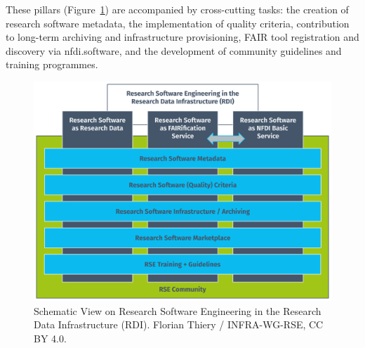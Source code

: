 \documentclass{eceasst}
\begin{document}
These pillars (Figure~\ref{fig:001}) are accompanied by cross-cutting tasks: the creation of research software metadata, the implementation of quality criteria, contribution to long-term archiving and infrastructure provisioning, FAIR tool registration and discovery via nfdi.software, and the development of community guidelines and training programmes.

\begin{figure}[h!]
\centering
\includegraphics[width=0.95\linewidth]{ECEASST-LaTeX-Templates/img/Fig_03.png}
\caption{Schematic View on Research Software Engineering in the Research Data Infrastructure (RDI). Florian Thiery / INFRA-WG-RSE, CC BY 4.0.}\label{fig:001}
\end{figure}
\end{document}
